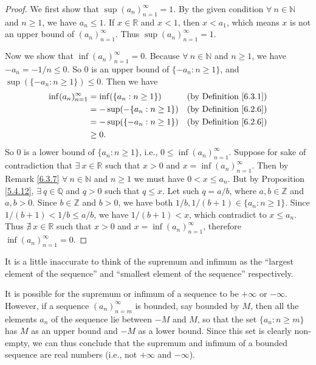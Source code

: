 \begin{proof}
We first show that \(\sup(a_n)_{n = 1}^\infty = 1\).
By the given condition \(\forall\ n \in \mathds{N}\) and \(n \geq 1\), we have \(a_n \leq 1\).
If \(x \in \mathds{R}\) and \(x < 1\), then \(x < a_1\), which means \(x\) is not an upper bound of \((a_n)_{n = 1}^\infty\).
Thus \(\sup(a_n)_{n = 1}^\infty = 1\).

Now we show that \(\inf(a_n)_{n = 1}^\infty = 0\).
Because \(\forall\ n \in \mathds{N}\) and \(n \geq 1\), we have \(-a_n = -1 / n \leq 0\).
So \(0\) is an upper bound of \(\{-a_n : n \geq 1\}\), and \(\sup(\{-a_n : n \geq 1\}) \leq 0\).
Then we have
\begin{align*}
\inf(a_n)_{n = 1}^\infty &= \inf(\{a_n : n \geq 1\}) & \text{(by Definition \ref{6.3.1})} \\
&= -\sup(-\{a_n : n \geq 1\}) & \text{(by Definition \ref{6.2.6})} \\
&= -\sup(\{-a_n : n \geq 1\}) & \text{(by Definition \ref{6.2.6})} \\
&\geq 0.
\end{align*}
So \(0\) is a lower bound of \(\{a_n : n \geq 1\}\), i.e., \(0 \leq \inf(a_n)_{n = 1}^\infty\).
Suppose for sake of contradiction that \(\exists\ x \in \mathds{R}\) such that \(x > 0\) and \(x = \inf(a_n)_{n = 1}^\infty\).
Then by Remark \ref{6.3.7} \(\forall\ n \in \mathds{N}\) and \(n \geq 1\) we must have \(0 < x \leq a_n\).
But by Proposition \ref{5.4.12}, \(\exists\ q \in \mathds{Q}\) and \(q > 0\) such that \(q \leq x\).
Let such \(q = a / b\), where \(a, b \in \mathds{Z}\) and \(a, b > 0\).
Since \(b \in \mathds{Z}\) and \(b > 0\), we have both \(1 / b, 1 / (b + 1) \in \{a_n : n \geq 1\}\).
Since \(1 / (b + 1) < 1 / b \leq a / b\), we have \(1 / (b + 1) < x\), which contradict to \(x \leq a_n\).
Thus \(\nexists\ x \in \mathds{R}\) such that \(x > 0\) and \(x = \inf(a_n)_{n = 1}^\infty\), therefore \(\inf(a_n)_{n = 1}^\infty = 0\).
\end{proof}

\begin{note}
It is a little inaccurate to think of the supremum and infimum as the ``largest element of the sequence'' and ``smallest element of the sequence'' respectively.
\end{note}

\begin{note}
It is possible for the supremum or infimum of a sequence to be \(+\infty\) or \(-\infty\).
However, if a sequence \((a_n)_{n = m}^\infty\) is bounded, say bounded by \(M\), then all the elements \(a_n\) of the sequence lie between \(-M\) and \(M\), so that the set \(\{a_n : n \geq m\}\) has \(M\) as an upper bound and \(-M\) as a lower bound.
Since this set is clearly non-empty, we can thus conclude that the supremum and infimum of a bounded sequence are real numbers (i.e., not \(+\infty\) and \(-\infty\)).
\end{note}

